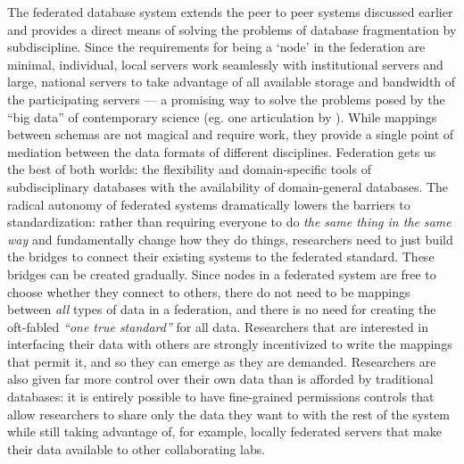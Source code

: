 \documentclass[11pt]{article}
\begin{document}
\begin{multicols}{2}
The federated database system extends the peer to peer systems discussed
earlier and provides a direct means of solving the problems of database
fragmentation by subdiscipline. Since the requirements for being a
`node' in the federation are minimal, individual, local servers work
seamlessly with institutional servers and large, national servers to
take advantage of all available storage and bandwidth of the
participating servers --- a promising way to solve the problems posed by
the ``big data'' of contemporary science (eg. one articulation by \cite{charlesCommunityDrivenBigOpen2020} ). While mappings between
schemas are not magical and require work, they provide a single point of
mediation between the data formats of different disciplines. Federation
gets us the best of both worlds: the flexibility and domain-specific
tools of subdisciplinary databases with the availability of
domain-general databases. The radical autonomy of federated systems
dramatically lowers the barriers to standardization: rather than
requiring everyone to do \emph{the same thing in the same way} and
fundamentally change how they do things, researchers need to just build
the bridges to connect their existing systems to the federated standard.
These bridges can be created gradually. Since nodes in a federated
system are free to choose whether they connect to others, there do not
need to be mappings between \emph{all} types of data in a federation,
and there is no need for creating the oft-fabled \emph{``one true
standard''} for all data. Researchers that are interested in interfacing
their data with others are strongly incentivized to write the mappings
that permit it, and so they can emerge as they are demanded. Researchers
are also given far more control over their own data than is afforded by
traditional databases: it is entirely possible to have fine-grained
permissions controls that allow researchers to share only the data they
want to with the rest of the system while still taking advantage of, for
example, locally federated servers that make their data available to
other collaborating labs.


\end{multicols}
\end{document}
